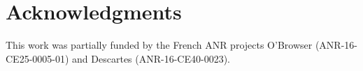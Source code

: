 
\section*{Acknowledgments}

This work was partially
funded by
the French ANR projects O'Browser (\mbox{ANR-16-CE25-0005-01}) and Descartes
(\mbox{ANR-16-CE40-0023}).


